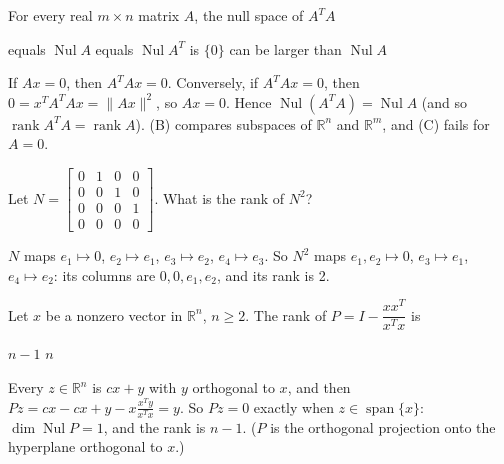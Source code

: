 \begin{question}[id=rank-18, marks=2]
For every real $m \times n$ matrix $A$, the null space of $A^TA$
\begin{options}
  \correct equals $\operatorname{Nul} A$
  \option equals $\operatorname{Nul} A^T$
  \option is $\{0\}$
  \option can be larger than $\operatorname{Nul} A$
\end{options}
\begin{solution}
If $Ax = 0$, then $A^TAx = 0$. Conversely, if $A^TAx = 0$, then $0 = x^TA^TAx = \|Ax\|^2$, so $Ax = 0$. Hence $\operatorname{Nul}(A^TA) = \operatorname{Nul} A$ (and so $\operatorname{rank} A^TA = \operatorname{rank} A$). (B) compares subspaces of $\mathbb{R}^n$ and $\mathbb{R}^m$, and (C) fails for $A = 0$.
\end{solution}
\end{question}

\begin{question}[id=rank-19]
Let $N = \begin{bmatrix} 0 & 1 & 0 & 0 \\ 0 & 0 & 1 & 0 \\ 0 & 0 & 0 & 1 \\ 0 & 0 & 0 & 0 \end{bmatrix}$. What is the rank of $N^2$?
\begin{solution}
$N$ maps $e_1 \mapsto 0$, $e_2 \mapsto e_1$, $e_3 \mapsto e_2$, $e_4 \mapsto e_3$. So $N^2$ maps $e_1, e_2 \mapsto 0$, $e_3 \mapsto e_1$, $e_4 \mapsto e_2$: its columns are $0, 0, e_1, e_2$, and its rank is 2.
\end{solution}
\end{question}

\begin{question}[id=rank-20, marks=2]
Let $x$ be a nonzero vector in $\mathbb{R}^n$, $n \ge 2$. The rank of $P = I - \dfrac{xx^T}{x^Tx}$ is
\begin{options}
  \correct $n - 1$
  \option $n$
\end{options}
\begin{solution}
Every $z \in \mathbb{R}^n$ is $cx + y$ with $y$ orthogonal to $x$, and then $Pz = cx - cx + y - x\frac{x^Ty}{x^Tx} = y$. So $Pz = 0$ exactly when $z \in \operatorname{span}\{x\}$: $\dim \operatorname{Nul} P = 1$, and the rank is $n - 1$. ($P$ is the orthogonal projection onto the hyperplane orthogonal to $x$.)
\end{solution}
\end{question}

